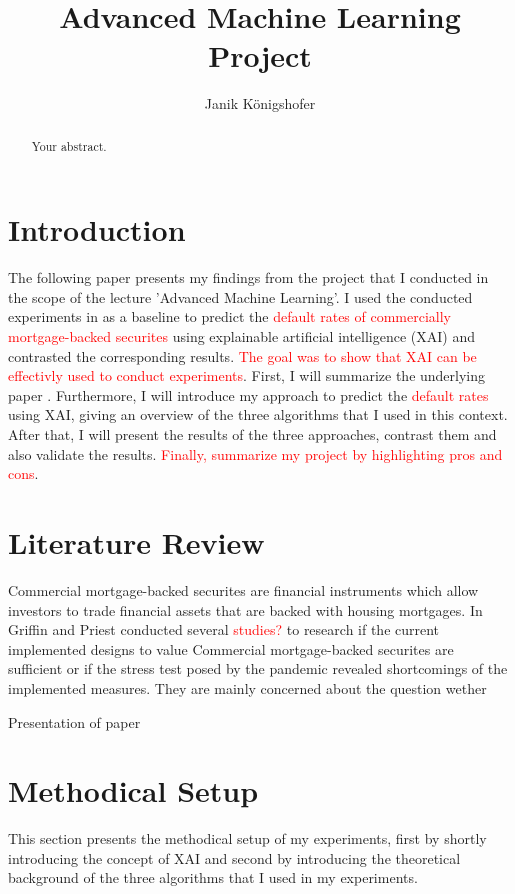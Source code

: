 \documentclass{article}
\title{Advanced Machine Learning Project}
\author{Janik Königshofer}
\begin{document}
\maketitle

\begin{abstract}
Your abstract.
\end{abstract}

\section{Introduction}
The following paper presents my findings from the project that I conducted in the scope of the lecture 'Advanced Machine Learning'.
I used the conducted experiments in \cite{CMBS-Paper} as a baseline to predict the \textcolor{red}{default rates of commercially mortgage-backed securites} using explainable artificial intelligence (XAI) and contrasted the corresponding results.
\textcolor{red}{The goal was to show that XAI can be effectivly used to conduct experiments}.
First, I will summarize the underlying paper \cite{CMBS-Paper}. Furthermore, I will introduce my approach to predict the \textcolor{red}{default rates} using XAI, giving an overview of the three algorithms that I used in this context. After that, I will present the results of the three approaches, contrast them and also validate the results.
\textcolor{red}{Finally, summarize my project by highlighting pros and cons}.


\section{Literature Review}
Commercial mortgage-backed securites are financial instruments which allow investors to trade financial assets that are backed with housing mortgages. 
In \cite{CMBS-Paper} Griffin and Priest conducted several \textcolor{red}{studies?} 
to research if the current implemented designs to value Commercial mortgage-backed securites are sufficient
or if the stress test posed by the pandemic revealed shortcomings of the implemented measures.
They are mainly concerned about the question wether  


Presentation of paper

\section{Methodical Setup}
This section presents the methodical setup of my experiments, first by shortly introducing the concept of XAI and second by introducing the theoretical background of the three algorithms that I used in my experiments.
\end{document}
